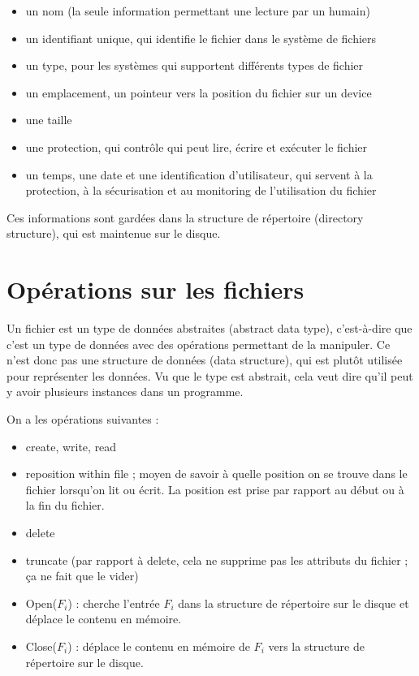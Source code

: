 \begin{itemize}
	\item un nom (la seule information permettant une lecture par un humain)
	\item un identifiant unique, qui identifie le fichier dans le système de fichiers
	\item un type, pour les systèmes qui supportent différents types de fichier
	\item un emplacement, un pointeur vers la position du fichier sur un device
	\item une taille
	\item une protection, qui contrôle qui peut lire, écrire et exécuter le fichier
	\item un temps, une date et une identification d'utilisateur, qui servent à la protection, à la sécurisation et au monitoring de l'utilisation du fichier
\end{itemize}

Ces informations sont gardées dans la structure de répertoire (directory structure), qui est maintenue sur le disque.

\section{Opérations sur les fichiers}

Un fichier est un type de données abstraites (abstract data type), c'est-à-dire que c'est un type de données avec des opérations permettant de la manipuler. Ce n'est donc pas une structure de données (data structure), qui est plutôt utilisée pour représenter les données. Vu que le type est abstrait, cela veut dire qu'il peut y avoir plusieurs instances dans un programme.

On a les opérations suivantes :

\begin{itemize}
	\item create, write, read
	\item reposition within file ; moyen de savoir à quelle position on se trouve dans le fichier lorsqu'on lit ou écrit. La position est prise par rapport au début ou à la fin du fichier.
	\item delete
	\item truncate (par rapport à delete, cela ne supprime pas les attributs du fichier ; ça ne fait que le vider)
	\item Open($F_i$) : cherche l'entrée $F_i$ dans la structure de répertoire sur le disque et déplace le contenu en mémoire.
	
	\item Close($F_i$) : déplace le contenu en mémoire de $F_i$ vers la structure de répertoire sur le disque.
\end{itemize}

